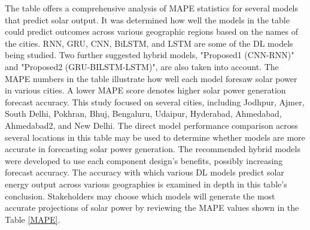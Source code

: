 \documentclass[a4paper,fleqn]{cas-sc}
\begin{document}
The table offers a comprehensive analysis of MAPE statistics for several models that predict solar output. It was determined how well the models in the table could predict outcomes across various geographic regions based on the names of the cities. RNN, GRU, CNN, BiLSTM, and LSTM are some of the DL models being studied. Two further suggested hybrid models, "Proposed1 (CNN-RNN)" and "Proposed2 (GRU-BILSTM-LSTM)", are also taken into account. The MAPE numbers in the table illustrate how well each model foresaw solar power in various cities. A lower MAPE score denotes higher solar power generation forecast accuracy. This study focused on several cities, including Jodhpur, Ajmer, South Delhi, Pokhran, Bhuj, Bengaluru, Udaipur, Hyderabad, Ahmedabad, Ahmedabad2, and New Delhi. The direct model performance comparison across several locations in this table may be used to determine whether models are more accurate in forecasting solar power generation. The recommended hybrid models were developed to use each component design's benefits, possibly increasing forecast accuracy. The accuracy with which various DL models predict solar energy output across various geographies is examined in depth in this table's conclusion. Stakeholders may choose which models will generate the most accurate projections of solar power by reviewing the MAPE values shown in the Table \ref{MAPE}.
\end{document}
